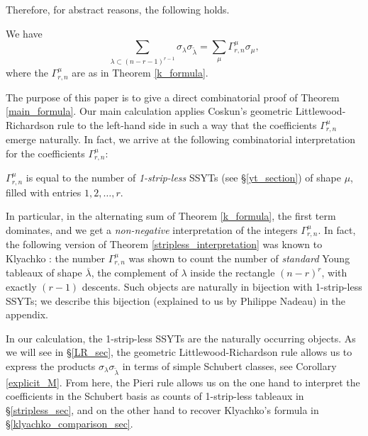 Therefore, for abstract reasons, the following holds.

\begin{thm}\label{main_formula}
We have
\begin{equation*}
\sum_{\lambda\subset(n-r-1)^{r-1}}\sigma_{\lambda}\sigma_{\widetilde{\lambda}}=\sum_{\mu} \Gamma^\mu_{r,n}\sigma_{\mu},
\end{equation*}
where the $\Gamma^\mu_{r,n}$ are as in Theorem \ref{k_formula}.
\end{thm}

The purpose of this paper is to give a direct combinatorial proof of Theorem \ref{main_formula}. Our main calculation applies Coskun's geometric Littlewood-Richardson rule \cite{Cos09} to the left-hand side in such a way that the coefficients $\Gamma^\mu_{r,n}$ emerge naturally. In fact, we arrive at the following combinatorial interpretation for the coefficients $\Gamma^\mu_{r,n}$:

\begin{thm}\label{stripless_interpretation}
$\Gamma^\mu_{r,n}$ is equal to the number of \textit{1-strip-less} SSYTs (see \S\ref{yt_section}) of shape $\mu$, filled with entries $1,2,\ldots,r$. 
\end{thm}

In particular, in the alternating sum of Theorem \ref{k_formula}, the first term dominates, and we get a \emph{non-negative} interpretation of the integers $\Gamma^\mu_{r,n}$. In fact, the following version of Theorem \ref{stripless_interpretation} was known to Klyachko \cite[Theorem 3.3]{K95}: the number $\Gamma^\mu_{r,n}$ was shown to count the number of \emph{standard} Young tableaux of shape $\overline{\lambda}$, the complement of $\lambda$ inside the rectangle $(n-r)^r$, with exactly $(r-1)$ descents. Such objects are naturally in bijection with 1-strip-less SSYTs; we describe this bijection (explained to us by Philippe Nadeau) in the appendix.

In our calculation, the 1-strip-less SSYTs are the naturally occurring objects. As we will see in \S\ref{LR_sec}, the geometric Littlewood-Richardson rule allows us to express the products $\sigma_{\lambda}\sigma_{\widetilde{\lambda}}$ in terms of simple Schubert classes, see Corollary \ref{explicit_M}. From here, the Pieri rule allows us on the one hand to interpret the coefficients in the Schubert basis as counts of 1-strip-less tableaux in \S\ref{stripless_sec}, and on the other hand to recover Klyachko's formula in \S\ref{klyachko_comparison_sec}.

